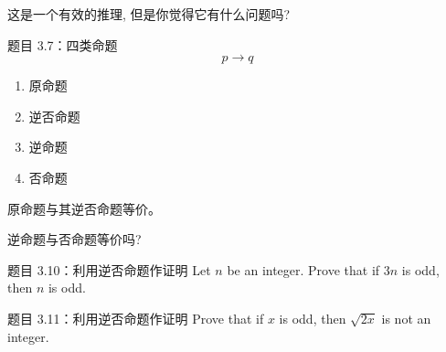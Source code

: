\begin{frame}{}
  这是一个有效的推理, 但是你觉得它有什么问题吗?
  
\end{frame}

\begin{frame}{}
  \begin{quote}
    \centerline{}
  \end{quote}
\end{frame}

\begin{frame}{}
  \begin{exampleblock}{题目 3.7：四类命题}
    \[
      p \to q
    \]
    \begin{enumerate}
      \item 原命题
      \item 逆否命题
      \item 逆命题
      \item 否命题
    \end{enumerate}
  \end{exampleblock}

  \vspace{0.50cm}
  \centerline{原命题与其逆否命题等价。}
  \pause
  \vspace{0.50cm}
  \centerline{逆命题与否命题等价吗?}
\end{frame}

\begin{frame}{}
  \begin{exampleblock}{题目 3.10：利用逆否命题作证明}
    Let $n$ be an integer. Prove that if $3n$ is odd, then $n$ is odd.
  \end{exampleblock}

  \vspace{0.60cm}

  \begin{exampleblock}{题目 3.11：利用逆否命题作证明}
    Prove that if $x$ is odd, then $\sqrt{2x}$ is not an integer.
  \end{exampleblock}
\end{frame}
